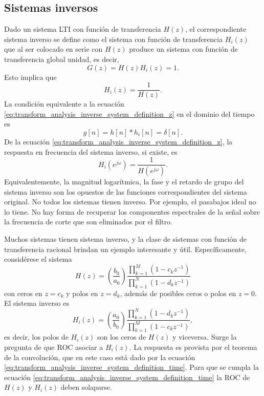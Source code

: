 \documentclass[a4paper]{report}
\begin{document}
\subsection{Sistemas inversos}\label{sec:transform_analysis_inverse_systems}

Dado un sistema LTI con función de transferencia \(H(z)\), el correspondiente sistema inverso se define como el sistema con función de transferencia \(H_i(z)\) que al ser colocado en serie con \(H(z)\) produce un sistema con función de transferencia global unidad, es decir,
\begin{equation}\label{eq:transform_analysis_inverse_system_definition_z}
 G(z)=H(z)H_i(z)=1. 
\end{equation}
Esto implica que 
\[
 H_i(z)=\frac{1}{H(z)}.
\]
La condición equivalente a la ecuación \ref{eq:transform_analysis_inverse_system_definition_z} en el dominio del tiempo es
\begin{equation}\label{eq:transform_analysis_inverse_system_definition_time}
 g[n]=h[n]*h_i[n]=\delta[n]. 
\end{equation}
De la ecuación \ref{eq:transform_analysis_inverse_system_definition_z}, la respuesta en frecuencia del sistema inverso, si existe, es
\[
 H_i(e^{j\omega})=\frac{1}{H(e^{j\omega})}.
\]
Equivalentemente, la magnitud logarítmica, la fase y el retardo de grupo del sistema inverso son los opuestos de las funciones correspondientes del sistema original. No todos los sistemas tienen inverso. Por ejemplo, el pasabajos ideal no lo tiene. No hay forma de recuperar los componentes espectrales de la señal sobre la frecuencia de corte que son eliminados por el filtro.  

Muchos sistemas tienen sistema inverso, y la clase de sistemas con función de transferencia racional brindan un ejemplo interesante y útil. Específicamente, considérese el sistema
\[
 H(z)=\left(\frac{b_0}{a_0}\right)\frac{\prod\limits_{k=1}^M(1-c_kz^{-1})}{\prod\limits_{k=1}^N(1-d_kz^{-1})} 
\]
con ceros en \(z=c_k\) y polos en \(z=d_k\), además de posibles ceros o polos en \(z=0\). El sistema inverso es
\[
 H_i(z)=\left(\frac{a_0}{b_0}\right)\frac{\prod\limits_{k=1}^N(1-d_kz^{-1})}{\prod\limits_{k=1}^M(1-c_kz^{-1})},
\]
es decir, los polos de \(H_i(z)\) son los ceros de \(H(z)\) y viceversa. Surge la pregunta de que ROC asociar a \(H_i(z)\). La respuesta es provista por el teorema de la convolución, que en este caso está dado por la ecuación \ref{eq:transform_analysis_inverse_system_definition_time}. Para que se cumpla la ecuación \ref{eq:transform_analysis_inverse_system_definition_time} la ROC de \(H(z)\) y \(H_i(z)\) deben solaparse.
\end{document}
